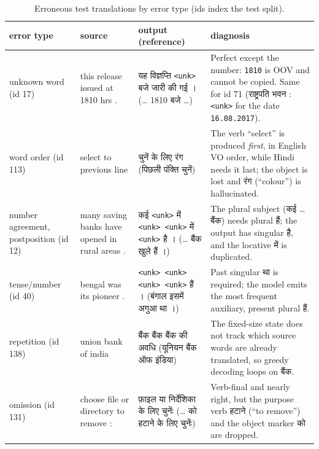 \documentclass[10pt,a4paper]{article}
\newcommand{\hi}[1]{{\hindifont #1}}
\newcommand{\code}[1]{\texttt{#1}}
\begin{document}
\begin{table}[H]
\centering\small
\begin{tabularx}{\textwidth}{p{2.2cm}p{3.6cm}YY}
\toprule
error type & source & output (reference) & diagnosis \\
\midrule
unknown word (id 17) & this release issued at 1810 hrs . & \hi{यह विज्ञप्ति} \code{<unk>} \hi{बजे जारी की गई ।}
(\hi{… 1810 बजे …}) & Perfect except the number: \code{1810} is OOV and cannot be copied. Same for id 71
(\hi{राष्ट्रपति भवन :} \code{<unk>} for the date \code{16.08.2017}). \\
word order (id 113) & select to previous line & \hi{चुनें के लिए रंग} (\hi{पिछली पंक्ति चुनें}) & The verb
``select'' is produced \emph{first}, in English VO order, while Hindi needs it last; the object is lost and
\hi{रंग} (``colour'') is hallucinated. \\
number agreement, postposition (id 12) & many saving banks have opened in rural areas . & \hi{कई} \code{<unk>}
\hi{में} \code{<unk> <unk>} \hi{में} \code{<unk>} \hi{है ।} (\hi{… बैंक खुले हैं ।}) & The plural subject
(\hi{कई … बैंक}) needs plural \hi{हैं}; the output has singular \hi{है}, and the locative \hi{में} is
duplicated. \\
tense/number (id 40) & bengal was its pioneer . & \code{<unk> <unk> <unk> <unk>} \hi{हैं ।}
(\hi{बंगाल इसमें अगुआ था ।}) & Past singular \hi{था} is required; the model emits the most frequent auxiliary,
present plural \hi{हैं}. \\
repetition (id 138) & union bank of india & \hi{बैंक बैंक बैंक की अवधि} (\hi{यूनियन बैंक ऑफ इंडिया}) &
The fixed-size state does not track which source words are already translated, so greedy decoding loops on
\hi{बैंक}. \\
omission (id 131) & choose file or directory to remove : & \hi{फ़ाइल या निर्देशिका के लिए चुनेंः}
(\hi{… को हटाने के लिए चुनेंः}) & Verb-final and nearly right, but the purpose verb \hi{हटाने} (``to remove'')
and the object marker \hi{को} are dropped. \\
\bottomrule
\end{tabularx}
\caption{Erroneous test translations by error type (ids index the test split).}
\label{tab:errors}
\end{table}
\end{document}

